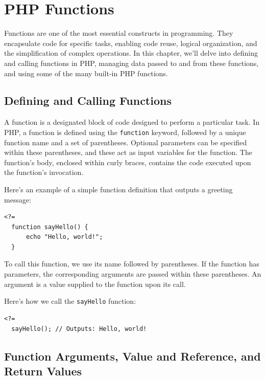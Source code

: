 \documentclass[11pt]{article}
\date{}
\title{}
\begin{document}
\setcounter{tocdepth}{3}
\tableofcontents

\setlength\parindent{10pt}

\section{PHP Functions}
\label{sec:org19b1d5a}
Functions are one of the most essential constructs in programming. They
encapsulate code for specific tasks, enabling code reuse, logical
organization, and the simplification of complex operations. In this
chapter, we'll delve into defining and calling functions in PHP,
managing data passed to and from these functions, and using some of the
many built-in PHP functions.

\subsection{Defining and Calling Functions}
\label{sec:org2eef0dc}
A function is a designated block of code designed to perform a
particular task. In PHP, a function is defined using the \texttt{function}
keyword, followed by a unique function name and a set of parentheses.
Optional parameters can be specified within these parentheses, and these
act as input variables for the function. The function's body, enclosed
within curly braces, contains the code executed upon the function's
invocation.

Here's an example of a simple function definition that outputs a
greeting message:

\begin{verbatim}
<?=
  function sayHello() {
      echo "Hello, world!";
  }
\end{verbatim}

To call this function, we use its name followed by parentheses. If the
function has parameters, the corresponding arguments are passed within
these parentheses. An argument is a value supplied to the function upon
its call.

Here's how we call the \texttt{sayHello} function:

\begin{verbatim}
<?=
  sayHello(); // Outputs: Hello, world!
\end{verbatim}

\subsection{Function Arguments, Value and Reference, and Return Values}
\label{sec:orgc8734aa}
\end{document}

